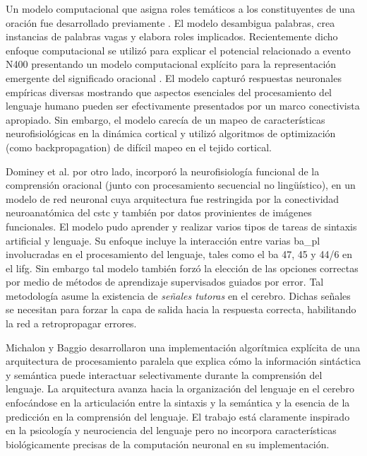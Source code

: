 Un modelo computacional que asigna roles temáticos a los constituyentes de una oración fue desarrollado previamente \cite{STJOHN1990217}.
El modelo desambigua palabras, crea instancias de palabras vagas y elabora roles implicados.
Recientemente dicho enfoque computacional se utilizó para explicar el potencial relacionado a evento N400 presentando un modelo computacional explícito para la representación emergente del significado oracional \cite{rabovsky_modelling_2018}.
El modelo capturó respuestas neuronales empíricas diversas mostrando que aspectos esenciales del procesamiento del lenguaje humano pueden ser efectivamente presentados por un marco conectivista apropiado.
Sin embargo, el modelo carecía de un mapeo de características neurofisiológicas en la dinámica cortical y utilizó algoritmos de optimización (como backpropagation) de difícil mapeo en el tejido cortical.

Dominey et al. \cite{Dominey2009NeuralNP} por otro lado, incorporó la neurofisiología funcional de la comprensión oracional (junto con procesamiento secuencial no lingüístico), en un modelo de red neuronal cuya arquitectura fue restringida por la conectividad neuroanatómica del \gls{cstc} y también por datos provinientes de imágenes funcionales. 
El modelo pudo aprender y realizar varios tipos de tareas de sintaxis artificial y lenguaje.
Su enfoque incluye la interacción entre varias \gls{ba_pl} involucradas en el procesamiento del lenguaje, tales como el \gls{ba} 47, 45 y 44/6 en el \gls{lifg}.
Sin embargo tal modelo también forzó la elección de las opciones correctas por medio de métodos de aprendizaje supervisados guiados por error.
Tal metodología asume la existencia de \emph{señales tutoras} en el cerebro. Dichas señales se necesitan para forzar la capa de salida hacia la respuesta correcta, habilitando la red a retropropagar errores.

Michalon y Baggio \cite{michalon_meaning-driven_2019} desarrollaron una implementación algorítmica explícita de una arquitectura de procesamiento paralela que explica cómo la información sintáctica y semántica puede interactuar selectivamente durante la comprensión del lenguaje.
La arquitectura avanza hacia la organización del lenguaje en el cerebro enfocándose en la articulación entre la sintaxis y la semántica y la esencia de la predicción en la comprensión del lenguaje.
El trabajo está claramente inspirado en la psicología y neurociencia del lenguaje pero no incorpora características biológicamente precisas de la computación neuronal en su implementación.

